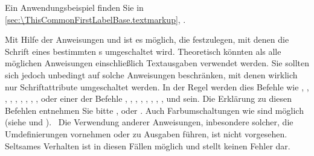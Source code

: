    \iffalse %
      Für Experten ist in \autoref{sec:experts.knowhow},
      \DescPageRef{experts.macroargs} dokumentiert, warum das Beispiel
      funktioniert, obwohl teilweise die Argumente von \Macro{Molek} nicht in
      geschweifte Klammern gesetzt wurden.%
    \fi%
  \else%
    Ein Anwendungsbeispiel finden Sie in
    \autoref{sec:\ThisCommonFirstLabelBase.textmarkup},
    .%
  \fi%
  \EndIndexGroup%
\fi


\begin{Declaration}
\end{Declaration}%
Mit%
 Hilfe der Anweisungen  und  ist es
möglich, die  festzulegen, mit denen die Schrift eines
bestimmten s umgeschaltet wird. Theoretisch könnten als
 alle möglichen Anweisungen einschließlich Textausgaben
verwendet werden.  Sie  sollten sich jedoch unbedingt auf
solche Anweisungen beschränken, mit denen wirklich nur Schriftattribute
umgeschaltet werden. In der Regel werden dies Befehle wie ,
, , , ,
, , , ,
 oder einer der Befehle , ,
, , , ,
, ,  und 
sein. Die Erklärung zu diesen Befehlen entnehmen Sie bitte \cite{l2kurz},
\cite{latex:usrguide} oder \cite{latex:fntguide}. Auch Farbumschaltungen wie
 sind möglich (siehe \cite{package:graphics} und
\cite{package:xcolor}).%
\iffalse %
\ Das Verhalten bei Verwendung anderer Anweisungen, inbesondere solcher, die
zu Umdefinierungen führen oder Ausgaben tätigen, ist nicht
definiert. Seltsames Verhalten ist möglich und stellt keinen Fehler dar.
\else%
\ Die Verwendung anderer Anweisungen, inbesondere solcher, die Umdefinierungen
vornehmen oder zu Ausgaben führen, ist nicht vorgesehen.  Seltsames Verhalten
ist in diesen Fällen möglich und stellt keinen Fehler dar.%
\fi


